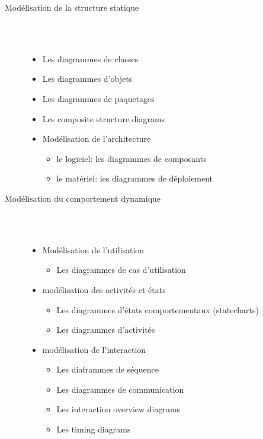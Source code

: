 \begin{description}
    \item[Modélisation de la structure statique]\\\
    \begin{itemize}
        \item Les diagrammes de classes
        \item Les diagrammes d'objets
        \item Les diagrammes de paquetages
        \item Les \og composite structure diagrams\fg\
        \item Modélisation de l’architecture
        \begin{itemize}
            \item le logiciel: les diagrammes de composants
            \item le matériel: les diagrammes de déploiement
        \end{itemize}
    \end{itemize}

    \item[Modélisation du comportement dynamique]\\\
    \begin{itemize}
        \item Modélisation de l’utilisation
        \begin{itemize}
            \item Les diagrammes de cas d'utilisation
        \end{itemize}
        \item modélisation des activités et états
        \begin{itemize}
            \item Les diagrammes d'états comportementaux (statecharts)
            \item Les diagrammes d'activités
        \end{itemize}
        \item modélisation de l'interaction
        \begin{itemize}
            \item Les diaframmes de séquence
            \item Les diagrammes de communication
            \item Les \og interaction overview diagrams\fg\
            \item Les \og timing diagrams\fg\
        \end{itemize}
    \end{itemize}
\end{description}

